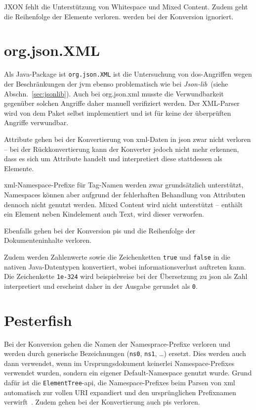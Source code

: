 JXON fehlt die Unterstützung von Whitespace und Mixed Content. Zudem geht die Reihenfolge der Elemente verloren.  werden bei der Konversion ignoriert.

\section{org.json.XML}
\label{sec:orgjsonxml}

Als Java-Package ist \texttt{org.json.XML} ist die Untersuchung von \acrshort{dos}-Angriffen wegen der Beschränkungen der \acrlong{jvm} ebenso problematisch wie bei \emph{Json-lib}~(siehe Abschn.~\ref{sec:jsonlib}). Auch bei org.json.\acrshort{xml} musste die Verwundbarkeit gegenüber solchen Angriffe daher manuell verifiziert werden. Der XML-Parser wird von dem Paket selbst implementiert und ist für keine der überprüften Angriffe verwundbar.

Attribute gehen bei der Konvertierung von \acrshort{xml}-Daten in \acrshort{json} zwar nicht verloren -- bei der Rückkonvertierung kann der Konverter jedoch nicht mehr erkennen, dass es sich um Attribute handelt und interpretiert diese stattdessen als Elemente.

\acrshort{xml}-Namespace-Prefixe für Tag-Namen werden zwar grundsätzlich unterstützt, Namespaces können aber aufgrund der fehlerhaften Behandlung von Attributen dennoch nicht genutzt werden.
 Mixed Content wird nicht unterstützt -- enthält ein Element neben Kindelement auch Text, wird dieser verworfen.

Ebenfalls gehen bei der Konversion \glspl{pi} und die Reihenfolge der Dokumenteninhalte verloren.

Zudem werden Zahlenwerte sowie die Zeichenketten \texttt{true} und \texttt{false} in die nativen Java-Datentypen konvertiert, wobei informationsverlust auftreten kann. Die Zeichenkette \texttt{1e-324} wird beispielweise bei der Übersetzung zu \acrshort{json} als Zahl interpretiert und erscheint daher in der Ausgabe gerundet als \texttt{0}.

\section{Pesterfish}
\label{sec:pesterfish}

Bei der Konversion gehen die Namen der Namesprace-Prefixe verloren und werden durch generische Bezeichnungen (\texttt{ns0}, \texttt{ns1}, \dots{}) ersetzt. Dies werden auch dann verwendet, wenn im Ursprungsdokument keinerlei Namespace-Prefixes verwendet wurden, sondern ein eigener Default-Namespace genutzt wurde. Grund dafür ist die \texttt{ElementTree}-\acrshort{api}, die Namespace-Prefixes beim Parsen von \acrshort{xml} automatisch zur vollen URI expandiert und den ursprünglichen Prefixnamen verwirft~\cite[Abschn.~20.5.1.7]{pythonetreexmlns}.
Zudem gehen bei der Konvertierung auch \glspl{pi} verloren.

